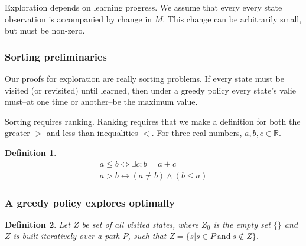 \documentclass[9pt,twocolumn,twoside]{pnas-new}
\newtheorem{definition}{Definition}
\begin{document}

Exploration depends on learning progress. We assume that every every state observation is accompanied by change in $M$. This change can be arbitrarily small, but must be non-zero. 

\subsubsection*{Sorting preliminaries}
Our proofs for exploration are really sorting problems. If every state must be visited (or revisited) until learned, then under a greedy policy every state's valie must--at one time or another--be the maximum value. 

Sorting requires ranking. Ranking requires that we make a definition for both the greater $>$ and less than inequalities $<$. For three real numbers, ${a,b,c} \in \mathbb{R}$.

\begin{definition} \label{def:ineq}
    \begin{align}
        a \leq b \Leftrightarrow \exists c; b = a + c \\
        a > b \leftrightarrow (a \neq b) \wedge (b \leq a) 
    \end{align}
\end{definition}

\subsubsection*{A greedy policy explores optimally}


\begin{definition}
    Let $Z$ be set of all visited states, where $Z_0$ is the empty set $\{\}$ and $Z$ is built iteratively over a path $P$, such that $Z = \{s | s \in P\ \text{and}\ s \not\in Z\}$.    
\end{definition}
\end{document}
